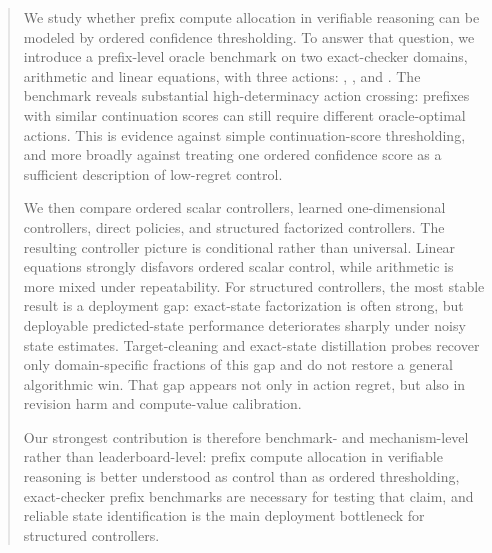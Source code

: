 \begin{abstract}
We study whether prefix compute allocation in verifiable reasoning can be modeled by ordered confidence thresholding.
To answer that question, we introduce a prefix-level oracle benchmark on two exact-checker domains, arithmetic and linear equations, with three actions: \continue, \revise, and \abstain.
The benchmark reveals substantial high-determinacy action crossing: prefixes with similar continuation scores can still require different oracle-optimal actions.
This is evidence against simple continuation-score thresholding, and more broadly against treating one ordered confidence score as a sufficient description of low-regret control.

We then compare ordered scalar controllers, learned one-dimensional controllers, direct policies, and structured factorized controllers.
The resulting controller picture is conditional rather than universal.
Linear equations strongly disfavors ordered scalar control, while arithmetic is more mixed under repeatability.
For structured controllers, the most stable result is a deployment gap: exact-state factorization is often strong, but deployable predicted-state performance deteriorates sharply under noisy state estimates.
Target-cleaning and exact-state distillation probes recover only domain-specific fractions of this gap and do not restore a general algorithmic win.
That gap appears not only in action regret, but also in revision harm and compute-value calibration.

Our strongest contribution is therefore benchmark- and mechanism-level rather than leaderboard-level:
prefix compute allocation in verifiable reasoning is better understood as \processstate control than as ordered thresholding, exact-checker prefix benchmarks are necessary for testing that claim, and reliable state identification is the main deployment bottleneck for structured controllers.
\end{abstract}
